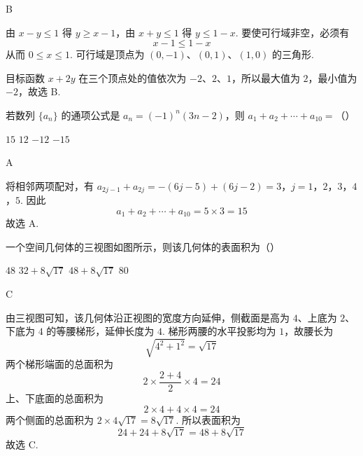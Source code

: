 \begin{answer}
B
\end{answer}

\begin{solution}
由 \(x-y\leqslant1\) 得 \(y\geqslant x-1\)，由 \(x+y\leqslant1\) 得 \(y\leqslant1-x\). 要使可行域非空，必须有
\[
x-1\leqslant1-x
\]
从而 \(0\leqslant x\leqslant1\). 可行域是顶点为 \((0,-1)\)、\((0,1)\)、\((1,0)\) 的三角形.

目标函数 \(x+2y\) 在三个顶点处的值依次为 \(-2\)、\(2\)、\(1\)，所以最大值为 \(2\)，最小值为 \(-2\)，故选 B.
\end{solution}

\begin{problem}
若数列 \(\{a_{n}\}\) 的通项公式是 \(a_{n} = (-1)^{n}(3n - 2)\)，则 \(a_{1} + a_{2} + \cdots + a_{10} =\)（\quad）

\choices
    {\(15\)}
    {\(12\)}
    {\(-12\)}
    {\(-15\)}
\end{problem}

\begin{answer}
A
\end{answer}

\begin{solution}
将相邻两项配对，有
\(a_{2j-1}+a_{2j}=-(6j-5)+(6j-2)=3\)，\(j=1\)，\(2\)，\(3\)，\(4\)，\(5\).
因此
\[
a_{1}+a_{2}+\cdots+a_{10}=5\times3=15
\]
故选 A.
\end{solution}

\begin{problem}
一个空间几何体的三视图如图所示，则该几何体的表面积为（\quad）


\choices
    {\(48\)}
    {\(32 + 8\sqrt{17}\)}
    {\(48 + 8\sqrt{17}\)}
    {\(80\)}
\end{problem}

\begin{answer}
C
\end{answer}

\begin{solution}
由三视图可知，该几何体沿正视图的宽度方向延伸，侧截面是高为 \(4\)、上底为 \(2\)、下底为 \(4\) 的等腰梯形，延伸长度为 \(4\). 梯形两腰的水平投影均为 \(1\)，故腰长为
\[
\sqrt{4^{2}+1^{2}}=\sqrt{17}
\]
两个梯形端面的总面积为
\[
2\times\frac{2+4}{2}\times4=24
\]
上、下底面的总面积为
\[
2\times4+4\times4=24
\]
两个侧面的总面积为 \(2\times4\sqrt{17}=8\sqrt{17}\). 所以表面积为
\[
24+24+8\sqrt{17}=48+8\sqrt{17}
\]
故选 C.
\end{solution}

